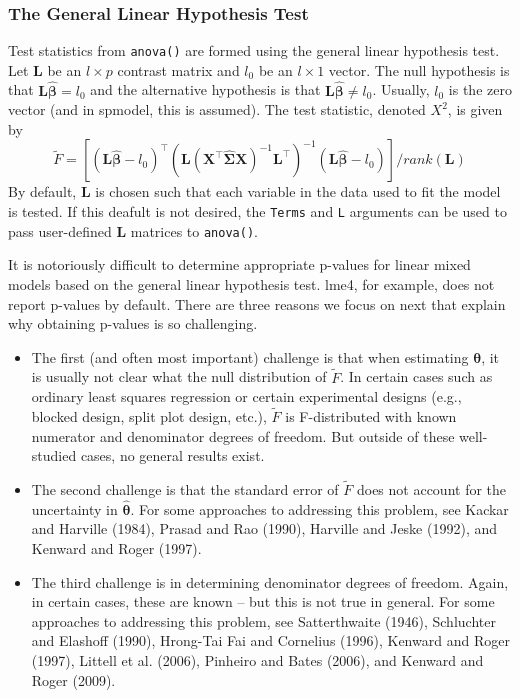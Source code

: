 \documentclass{article}
\providecommand{\tightlist}{%
  \setlength{\itemsep}{0pt}\setlength{\parskip}{0pt}}
\begin{document}
\hypertarget{the-general-linear-hypothesis-test}{%
\subsubsection{The General Linear Hypothesis
Test}\label{the-general-linear-hypothesis-test}}

Test statistics from \texttt{anova()} are formed using the general
linear hypothesis test. Let \(\mathbf{L}\) be an \(l \times p\) contrast
matrix and \(l_0\) be an \(l \times 1\) vector. The null hypothesis is
that \(\mathbf{L} \bm{\hat{\beta}} = l_0\) and the alternative
hypothesis is that \(\mathbf{L} \bm{\hat{\beta}} \neq l_0\). Usually,
\(l_0\) is the zero vector (and in spmodel, this is assumed). The test
statistic, denoted \(X^2\), is given by \begin{equation}\label{eq:glht}
  \tilde{F} = [(\mathbf{L} \bm{\hat{\beta}} - l_0)^\intercal(\mathbf{L} (\mathbf{X}^\intercal \mathbf{\hat{\Sigma}} \mathbf{X})^{-1} \mathbf{L}^\intercal)^{-1}(\mathbf{L} \bm{\hat{\beta}} - l_0)]/ rank(\mathbf{L})
\end{equation} By default, \(\mathbf{L}\) is chosen such that each
variable in the data used to fit the model is tested. If this deafult is
not desired, the \texttt{Terms} and \texttt{L} arguments can be used to
pass user-defined \(\mathbf{L}\) matrices to \texttt{anova()}.

It is notoriously difficult to determine appropriate p-values for linear
mixed models based on the general linear hypothesis test. lme4, for
example, does not report p-values by default. There are three reasons we
focus on next that explain why obtaining p-values is so challenging.

\begin{itemize}
\tightlist
\item
  The first (and often most important) challenge is that when estimating
  \(\bm{\theta}\), it is usually not clear what the null distribution of
  \(\tilde{F}\). In certain cases such as ordinary least squares
  regression or certain experimental designs (e.g., blocked design,
  split plot design, etc.), \(\tilde{F}\) is F-distributed with known
  numerator and denominator degrees of freedom. But outside of these
  well-studied cases, no general results exist.
\item
  The second challenge is that the standard error of \(\tilde{F}\) does
  not account for the uncertainty in \(\bm{\hat{\theta}}\). For some
  approaches to addressing this problem, see Kackar and Harville (1984),
  Prasad and Rao (1990), Harville and Jeske (1992), and Kenward and
  Roger (1997).
\item
  The third challenge is in determining denominator degrees of freedom.
  Again, in certain cases, these are known -- but this is not true in
  general. For some approaches to addressing this problem, see
  Satterthwaite (1946), Schluchter and Elashoff (1990), Hrong-Tai Fai
  and Cornelius (1996), Kenward and Roger (1997), Littell et al. (2006),
  Pinheiro and Bates (2006), and Kenward and Roger (2009).
\end{itemize}
\end{document}
